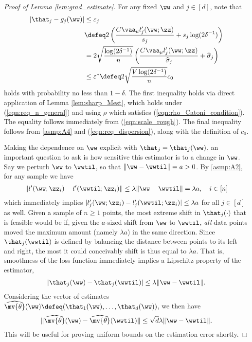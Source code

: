 \documentclass[11pt,oneside]{article}
\theoremstyle{definition} \newtheorem{defn}{Definition}       %
\theoremstyle{plain} \newtheorem{prop}[defn]{Proposition}           %
\theoremstyle{plain} \newtheorem{thm}[defn]{Theorem}                %
\theoremstyle{plain} \newtheorem{lem}[defn]{Lemma}                  %
\theoremstyle{plain} \newtheorem{cor}[defn]{Corollary}              %
\theoremstyle{remark} \newtheorem{rmk}[defn]{Remark}                %
\theoremstyle{remark} \newtheorem{ex}[defn]{Example}                %
\begin{document}
\begin{proof}[Proof of Lemma \ref{lem:grad_estimate}]
For any fixed $\ww$ and $j \in [d]$, note that
%
\begin{align}\label{eqn:grad_estimate_1}
\nonumber
|\that_{j} - g_{j}(\ww)| & \leq \varepsilon_{j}\\
&  \defeq 2\left( \frac{C\vaa_{\mu}l_{j}^{\prime}(\ww;\zz)}{s_{j}} + s_{j}\log(2\delta^{-1}) \right)\\
\nonumber
& = 2 \sqrt{\frac{\log(2\delta^{-1})}{n}} \left( \frac{C\vaa_{\mu}l_{j}^{\prime}(\ww;\zz)}{\widehat{\sigma}_{j}} + \widehat{\sigma}_{j} \right)\\
& \leq \varepsilon^{\ast} \defeq 2 \sqrt{\frac{V\log(2\delta^{-1})}{n}} c_{0} %
\end{align}
%
holds with probability no less than $1-\delta$. The first inequality holds via direct application of Lemma \ref{lem:sharp_Mest}, which holds under (\ref{eqn:req_n_general}) and using $\rho$ which satisfies (\ref{eqn:rho_Catoni_condition}). The equality follows immediately from (\ref{eqn:scale_rough}). The final inequality follows from \ref{asmp:A4} and (\ref{eqn:req_dispersion}), along with the definition of $c_{0}$.

Making the dependence on $\ww$ explicit with $\that_{j} = \that_{j}(\ww)$, an important question to ask is how sensitive this estimator is to a change in $\ww$. Say we perturb $\ww$ to $\wwtil$, so that $\|\ww - \wwtil\| = a > 0$. By \ref{asmp:A2}, for any sample we have
%
\begin{align*}
\|l^{\prime}(\ww;\zz_{i}) - l^{\prime}(\wwtil;\zz_{i})\| \leq \lambda \|\ww - \wwtil\| = \lambda a, \quad i \in [n]
\end{align*}
%
which immediately implies $|l^{\prime}_{j}(\ww;\zz_{i}) - l^{\prime}_{j}(\wwtil;\zz_{i})| \leq \lambda a$ for all $j \in [d]$ as well. Given a sample of $n \geq 1$ points, the most extreme shift in $\that_{j}(\cdot)$ that is feasible would be if, given the $a$-sized shift from $\ww$ to $\wwtil$, \textit{all} data points moved the maximum amount (namely $\lambda a$) in the same direction. Since $\that_{j}(\wwtil)$ is defined by balancing the distance between points to its left and right, the most it could conceivably shift is thus equal to $\lambda a$. That is, smoothness of the loss function immediately implies a Lipschitz property of the estimator,
%
\begin{align*}
|\that_{j}(\ww)-\that_{j}(\wwtil)| \leq \lambda \|\ww - \wwtil\|.
\end{align*}
%
Considering the vector of estimates $\widehat{\mv{\theta}}(\ww) \defeq (\that_{1}(\ww),\ldots,\that_{d}(\ww))$, we then have
%
\begin{align}\label{eqn:estimator_smoothness}
\|\widehat{\mv{\theta}}(\ww)-\widehat{\mv{\theta}}(\wwtil)\| \leq \sqrt{d}\lambda\|\ww - \wwtil\|.
\end{align}
%
This will be useful for proving uniform bounds on the estimation error shortly.


\end{proof}
\end{document}
